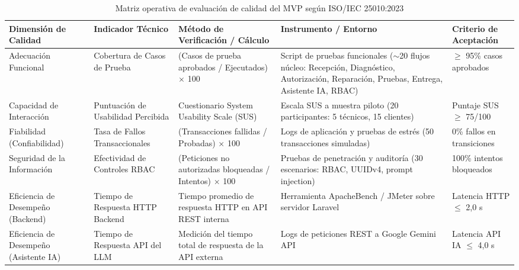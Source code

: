 \begin{table}[H]
\centering
\caption{Matriz operativa de evaluación de calidad del MVP según ISO/IEC 25010:2023}
\label{tab:matriz-iso25010}
\small
\begin{tabular}{p{2.2cm} p{2.5cm} p{3cm} p{3cm} p{2.3cm}}
\toprule
\textbf{Dimensión de Calidad} & \textbf{Indicador Técnico} & \textbf{Método de Verificación / Cálculo} & \textbf{Instrumento / Entorno} & \textbf{Criterio de Aceptación} \\
\midrule
Adecuación Funcional & Cobertura de Casos de Prueba & (Casos de prueba aprobados / Ejecutados) $\times$ 100 & Script de pruebas funcionales ($\sim$20 flujos núcleo: Recepción, Diagnóstico, Autorización, Reparación, Pruebas, Entrega, Asistente IA, RBAC) & $\geq$ 95\% casos aprobados \\
\addlinespace
Capacidad de Interacción & Puntuación de Usabilidad Percibida & Cuestionario System Usability Scale (SUS) & Escala SUS a muestra piloto (20 participantes: 5 técnicos, 15 clientes) & Puntaje SUS $\geq$ 75/100 \\
\addlinespace
Fiabilidad (Confiabilidad) & Tasa de Fallos Transaccionales & (Transacciones fallidas / Probadas) $\times$ 100 & Logs de aplicación y pruebas de estrés (50 transacciones simuladas) & 0\% fallos en transiciones \\
\addlinespace
Seguridad de la Información & Efectividad de Controles RBAC & (Peticiones no autorizadas bloqueadas / Intentos) $\times$ 100 & Pruebas de penetración y auditoría (30 escenarios: RBAC, UUIDv4, prompt injection) & 100\% intentos bloqueados \\
\addlinespace
Eficiencia de Desempeño (Backend) & Tiempo de Respuesta HTTP Backend & Tiempo promedio de respuesta HTTP en API REST interna & Herramienta ApacheBench / JMeter sobre servidor Laravel & Latencia HTTP $\leq$ 2,0 s \\
\addlinespace
Eficiencia de Desempeño (Asistente IA) & Tiempo de Respuesta API del LLM & Medición del tiempo total de respuesta de la API externa & Logs de peticiones REST a Google Gemini API & Latencia API IA $\leq$ 4,0 s \\
\bottomrule
\end{tabular}
\end{table}